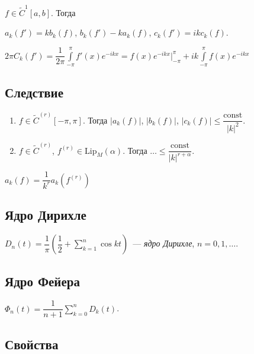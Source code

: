\documentclass{article}
\begin{document}
        $f \in \widetilde{C}^1 [a, b]$. Тогда
        
        $a_k(f') = k b_k(f)$, $b_k(f') - ka_k(f)$, $c_k(f') = i k c_k(f)$.
        
        $2 \pi C_k(f') = \dfrac{1}{2 \pi} \int\limits^{\pi}_{-\pi} f'(x) e^{-ikx}  = f(x) e^{-ikx} \bigg|^{\pi}_{-\pi} + ik   \int\limits^{\pi}_{-\pi} f(x)e^{-ikx}$
    
    \subsection{Следствие}
    
        \begin{enumerate}
        
            \item $f \in \widetilde{C}^{(r)} [-\pi, \pi]$. Тогда $|a_k(f)|$, $|b_k(f)|$, $|c_k(f)| \leqslant \dfrac{\mathrm{const}}{|k|^2}$.
        
            \item $f \in \widetilde{C}^{(r)}$, $f^{(r)} \in \mathrm{Lip}_M (\alpha)$. Тогда $\ldots \leqslant \dfrac{\mathrm{const}}{|k|^{r + \alpha}}$.
            
        \end{enumerate}
        
        $a_k(f) = \dfrac{1}{k^r} a_k \left( f^{(r)} \right)$
        
    \subsection{Ядро Дирихле}
    
        $D_n(t) = \dfrac{1}{\pi} \left( \dfrac{1}{2} + \sum\limits_{k = 1}^n \cos {kt} \right)$~--- \textit{ядро Дирихле}, $n = 0, 1, \ldots$.
        
    \subsection{Ядро Фейера}
    
        $\Phi_n(t) = \dfrac{1}{n + 1} \sum\limits_{k = 0}^n D_k(t)$.
        
    \subsection{Свойства}
    
\end{document}
